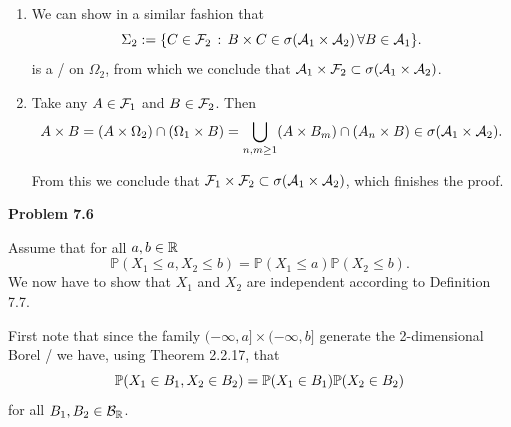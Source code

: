 \begin{enumerate}[label={(\alph*)}]
Note that $\cA_1 \subset \Sigma_1 \subset \cF_1$. From which it follows that $\Sigma_1 = \cF_1$. 

But then, from the definition of $\Sigma_1$ we have that $\cF_1 \times \cA_2 \subset \sigma(\cA_1 \times \cA_2)$.
\item {}
We can show in a similar fashion that
\[
	\Sigma_2 := \{C \in \mathcal F_2 \, : \, B \times C \in \sigma(\mathcal A_1 \times \mathcal A_2) \, \forall B \in \mathcal A_1\}.
\]
is a \sigalg/ on $\Omega_2$, from which we conclude that $\mathcal A_1 \times \mathcal F_2 \subset \sigma(\mathcal A_1 \times \mathcal A_2)$.
\item {}
Take any $A \in \mathcal F_1$ and $B \in \mathcal F_2$. Then
\[
	A \times B = (A \times \Omega_2) \cap (\Omega_1 \times B) = \bigcup_{n,m \ge 1} (A \times B_m) \cap (A_n \times B) \in \sigma(\mathcal A_1 \times \mathcal A_2).
\]

From this we conclude that $\mathcal F_1 \times \mathcal F_2 \subset \sigma(\mathcal A_1 \times \mathcal A_2)$, which finishes the proof.
\end{enumerate}

\bigskip

\textbf{Problem 7.6}

Assume that for all $a,b \in \mathbb R$
\[
	\mathbb{P}(X_1 \le a, X_2 \le b) = \mathbb{P}(X_1 \le a) \mathbb{P}(X_2 \le b).
\]
We now have to show that $X_1$ and $X_2$ are independent according to Definition 7.7.

First note that since the family $(-\infty, a] \times (-\infty ,b]$ generate the 2-dimensional Borel \sigalg/ we have, using Theorem 2.2.17, that
\[
	\mathbb P(X_1 \in B_1, X_2 \in B_2) = \mathbb P(X_1 \in B_1) \mathbb P(X_2 \in B_2)
\]
for all $B_1, B_2 \in \mathcal B_{\mathbb R}$.

